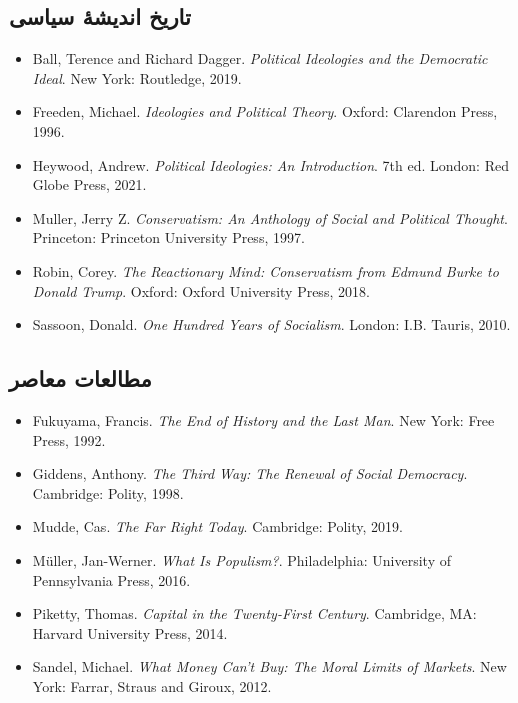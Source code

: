 \subsection*{تاریخ اندیشهٔ سیاسی}

\begin{itemize}[rightmargin=2cm]
    \item Ball, Terence and Richard Dagger. \textit{Political Ideologies and the Democratic Ideal}. New York: Routledge, 2019.
    \item Freeden, Michael. \textit{Ideologies and Political Theory}. Oxford: Clarendon Press, 1996.
    \item Heywood, Andrew. \textit{Political Ideologies: An Introduction}. 7th ed. London: Red Globe Press, 2021.
    \item Muller, Jerry Z. \textit{Conservatism: An Anthology of Social and Political Thought}. Princeton: Princeton University Press, 1997.
    \item Robin, Corey. \textit{The Reactionary Mind: Conservatism from Edmund Burke to Donald Trump}. Oxford: Oxford University Press, 2018.
    \item Sassoon, Donald. \textit{One Hundred Years of Socialism}. London: I.B. Tauris, 2010.
\end{itemize}

\subsection*{مطالعات معاصر}

\begin{itemize}[rightmargin=2cm]
    \item Fukuyama, Francis. \textit{The End of History and the Last Man}. New York: Free Press, 1992.
    \item Giddens, Anthony. \textit{The Third Way: The Renewal of Social Democracy}. Cambridge: Polity, 1998.
    \item Mudde, Cas. \textit{The Far Right Today}. Cambridge: Polity, 2019.
    \item Müller, Jan-Werner. \textit{What Is Populism?}. Philadelphia: University of Pennsylvania Press, 2016.
    \item Piketty, Thomas. \textit{Capital in the Twenty-First Century}. Cambridge, MA: Harvard University Press, 2014.
    \item Sandel, Michael. \textit{What Money Can't Buy: The Moral Limits of Markets}. New York: Farrar, Straus and Giroux, 2012.
\end{itemize}

